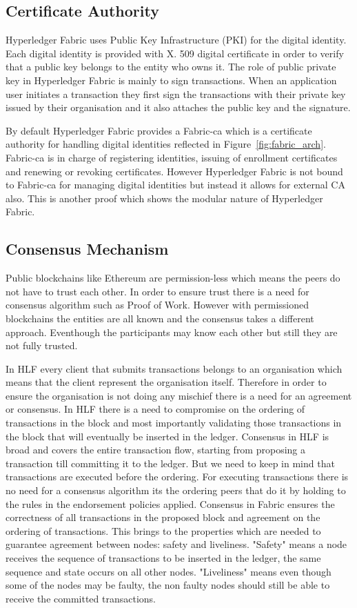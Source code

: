 \subsection{Certificate Authority}

Hyperledger Fabric uses Public Key Infrastructure (PKI) for the digital identity. Each digital identity is provided with X. 509 digital certificate in order to verify that a public key belongs to the entity who owns it. The role of public private key in Hyperledger Fabric is mainly to sign transactions. When an application user initiates a transaction they first sign the transactions with their private key issued by their organisation and it also attaches the public key and the signature. 

By default Hyperledger Fabric provides a Fabric-ca which is a certificate authority for handling digital identities reflected in Figure~\ref{fig:fabric_arch}. Fabric-ca is in charge of registering identities, issuing of enrollment certificates and renewing or revoking certificates. However Hyperledger Fabric is not bound to Fabric-ca for managing digital identities but instead it allows for external CA also. This is another proof which shows the modular nature of Hyperledger Fabric. 

\subsection{Consensus Mechanism}
Public blockchains like Ethereum are permission-less which means the peers do not have to trust each other. In order to ensure trust there is a need for consensus algorithm such as Proof of Work. However with permissioned blockchains the entities are all known and the consensus takes a different approach.  Eventhough the participants may know each other but still they are not fully trusted. 

In HLF every client that submits transactions belongs to an organisation which means that the client represent the organisation itself. Therefore in order to ensure the organisation is not doing any mischief there is a need for an agreement or consensus.   
In HLF there is a need to compromise on the ordering of transactions in the block and most importantly validating those transactions in the block that will eventually be inserted in the ledger. Consensus in HLF is broad and covers the entire transaction flow, starting from proposing a transaction till committing it to the ledger. But we need to keep in mind that transactions are executed before the ordering. For executing transactions there is no need for a consensus algorithm its the ordering peers that do it by holding to the rules in the endorsement policies applied. Consensus in Fabric ensures the correctness of all transactions in the proposed block and agreement on the ordering of transactions. This brings to the properties which are needed to guarantee agreement between nodes: safety and liveliness. "Safety" means a node receives the sequence of transactions to be inserted in the ledger, the same sequence and state occurs on all other nodes. "Liveliness" means even though some of the nodes may be faulty, the non faulty nodes should still be able to receive the committed transactions. 

